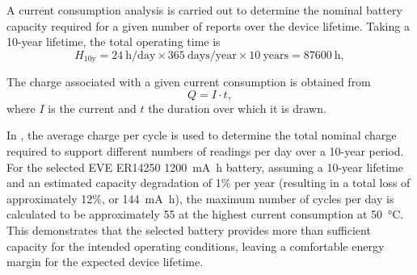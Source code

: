 

A current consumption analysis is carried out to determine the nominal battery capacity required for a given number of reports over the device lifetime. Taking a \num{10}-year lifetime, the total operating time is
\begin{equation}
    H_{10\text{y}} = 24~\text{h/day} \times 365~\text{days/year}
        \times 10~\text{years} = \SI{87600}{\hour},
\end{equation}

The charge associated with a given current consumption is obtained from
\begin{equation}
    Q = I \cdot t,
\end{equation}
where $I$ is the current and $t$ the duration over which it is drawn.

In , the average charge per cycle is used to determine the total nominal charge required to support different numbers of readings per day over a 10-year period. For the selected EVE ER14250 \SI{1200}{\milli\ampere\hour} battery, assuming a 10-year lifetime and an estimated capacity degradation of 1\% per year (resulting in a total loss of approximately 12\%, or \SI{144}{\milli\ampere\hour}), the maximum number of cycles per day is calculated to be approximately 55 at the highest current consumption at \SI{50}{\celsius}. This demonstrates that the selected battery provides more than sufficient capacity for the intended operating conditions, leaving a comfortable energy margin for the expected device lifetime.

